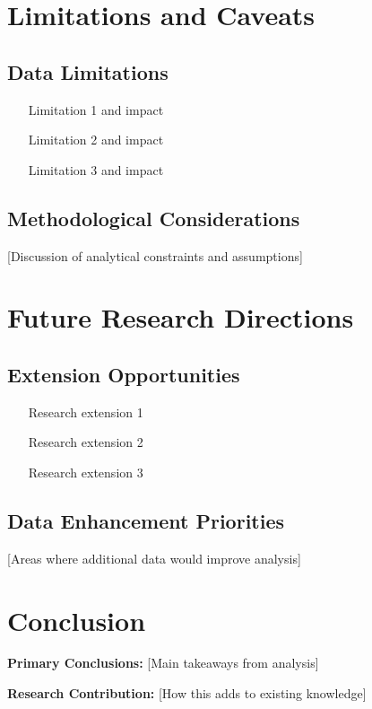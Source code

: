 \documentclass[11pt,letterpaper]{article}
\begin{document}
\section{Limitations and Caveats}

\subsection{Data Limitations}
\begin{itemize}
    \item [Limitation 1 and impact]
    \item [Limitation 2 and impact]
    \item [Limitation 3 and impact]
\end{itemize}

\subsection{Methodological Considerations}
[Discussion of analytical constraints and assumptions]

\section{Future Research Directions}

\subsection{Extension Opportunities}
\begin{itemize}
    \item [Research extension 1]
    \item [Research extension 2]
    \item [Research extension 3]
\end{itemize}

\subsection{Data Enhancement Priorities}
[Areas where additional data would improve analysis]

\section{Conclusion}

\textbf{Primary Conclusions:} [Main takeaways from analysis]

\textbf{Research Contribution:} [How this adds to existing knowledge]
\end{document}

